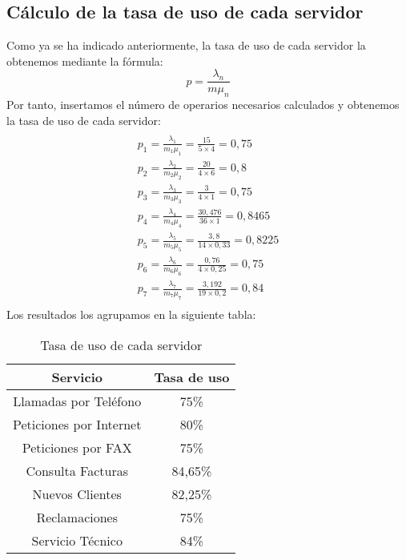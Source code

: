 \subsection{Cálculo de la tasa de uso de cada servidor}
Como ya se ha indicado anteriormente, la tasa de uso de cada servidor la obtenemos mediante la fórmula:
\begin{equation}
p = \frac{\lambda_{n}}{m\mu_{n}}
\end{equation}
Por tanto, insertamos el número de operarios necesarios calculados y obtenemos la tasa de uso de cada servidor:
\begin{multline}\\
p_{1} = \frac{\lambda_{1}}{m_{1}\mu_{1}} = \frac{15}{5\times 4} = 0,75 \\
p_{2} = \frac{\lambda_{2}}{m_{2}\mu_{2}} = \frac{20}{4\times 6} = 0,8\\
p_{3} = \frac{\lambda_{3}}{m_{3}\mu_{3}} = \frac{3}{4\times 1} = 0,75\\
p_{4} = \frac{\lambda_{4}}{m_{4}\mu_{4}} = \frac{30,476}{36\times 1} = 0,8465\\
p_{5} = \frac{\lambda_{5}}{m_{5}\mu_{5}} = \frac{3,8}{14\times 0,33} = 0,8225\\
p_{6} = \frac{\lambda_{6}}{m_{6}\mu_{6}} = \frac{0,76}{4\times 0,25} = 0,75\\
p_{7} = \frac{\lambda_{7}}{m_{7}\mu_{7}} = \frac{3,192}{19\times 0,2} = 0,84\\
\end{multline}
Los resultados los agrupamos en la siguiente tabla:
\begin{table}[H]
  \begin{center}
  \begin{tabular}{|c|c|}
    \hline
    \textbf{Servicio}       & \textbf{Tasa de uso} \\ \hline
    Llamadas por Teléfono   & 75\%                   \\ \hline
    Peticiones por Internet & 80\%                  \\ \hline
    Peticiones por FAX      & 75\%                   \\ \hline
    Consulta Facturas      & 84,65\%                   \\ \hline
    Nuevos Clientes      & 82,25\%                   \\ \hline
    Reclamaciones      & 75\%                   \\ \hline
    Servicio Técnico      & 84\%                  \\ \hline
  \end{tabular}
\end{center}
  \caption{Tasa de uso de cada servidor}
  \end{table}
